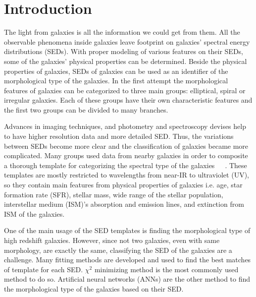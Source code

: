 \section{Introduction}
\label{sec: intro}
The light from galaxies is all the information we could get from them. 
All the observable phenomena inside galaxies leave footprint on galaxies' spectral energy distributions (SEDs).
With proper modeling of various features on their SEDs, some of the galaxies' physical properties can be determined.
Beside the physical properties of galaxies, SEDs of galaxies can be used as an identifier of the morphological type of the galaxies.
In the first attempt the morphological features of galaxies can be categorized to three main groups: elliptical, spiral or irregular galaxies.
Each of these groups have their own characteristic features and the first two groups can be divided to many branches.

Advances in imaging techniques, and photometry and spectroscopy devises help to have higher resolution data and more detailed SED. 
Thus, the variations between SEDs become more clear and the classification of galaxies became more complicated.
Many groups used data from nearby galaxies in order to composite a thorough template for categorizing the spectral type of the galaxies~\citep[e.g.][]{Kinney94}~\citep[][hereafter K96]{Kinney96}~\citep[][]{Bershady00}.%
These templates are mostly restricted to wavelengths from near-IR to ultraviolet (UV), so they contain main features from physical properties of galaxies i.e. age, star formation rate (SFR), stellar mass, wide range of the stellar population, interstellar medium (ISM)'s absorption and emission lines, and extinction from ISM of the galaxies.

One of the main usage of the SED templates is finding the morphological type of high redshift galaxies. 
However, since not two galaxies, even with same morphology, are exactly the same, classifying the SED of the galaxies are a challenge.
Many fitting methods are developed and used to find the best matches of template for each SED.
$\chi^2$ minimizing method is the most commonly used method to do so. 
Artificial neural networks (ANNs) are the other method to find the morphological type of the galaxies based on their SED.

